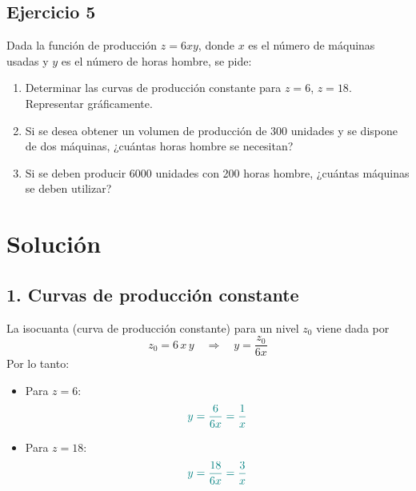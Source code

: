 \documentclass{article}
\begin{document}
\newpage

\subsection{Ejercicio 5}
Dada la función de producción \( z = 6xy \), donde \( x \) es el número de máquinas usadas y \( y \) es el número de horas hombre, se pide:

\begin{enumerate}
  \item Determinar las curvas de producción constante para \( z = 6 \), \( z = 18 \). Representar gráficamente.
  
  \item Si se desea obtener un volumen de producción de 300 unidades y se dispone de dos máquinas, ¿cuántas horas hombre se necesitan?

  \item Si se deben producir 6000 unidades con 200 horas hombre, ¿cuántas máquinas se deben utilizar?
\end{enumerate}

\newpage
\section*{Solución}

\subsection*{1. Curvas de producción constante}

La isocuanta (curva de producción constante) para un nivel \(z_0\) viene dada por
\[
z_0 = 6\,x\,y
\quad\Longrightarrow\quad
y = \frac{z_0}{6x}
\]
Por lo tanto:
\begin{itemize}
  \item Para \(z = 6\):
  \[
  \color{teal} y = \frac{6}{6x} = \frac{1}{x}
  \]
  \item Para \(z = 18\):
  \[
  \color{teal} y = \frac{18}{6x} = \frac{3}{x}
  \]
\end{itemize}

\bigskip

\end{document}
